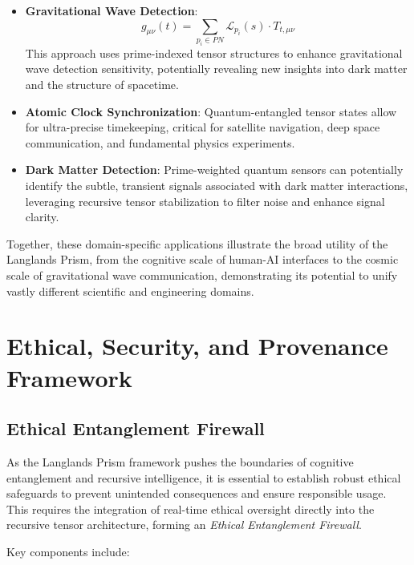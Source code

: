 \documentclass[11pt]{article}
\begin{document}
\begin{itemize}
    \item \textbf{Gravitational Wave Detection}:
    \[
    g_{\mu\nu}(t) = \sum_{p_i \in PN} \mathcal{L}_{p_i}(s) \cdot T_{t, \mu\nu}
    \]
    This approach uses prime-indexed tensor structures to enhance gravitational wave detection sensitivity, potentially revealing new insights into dark matter and the structure of spacetime.

    \item \textbf{Atomic Clock Synchronization}:
    Quantum-entangled tensor states allow for ultra-precise timekeeping, critical for satellite navigation, deep space communication, and fundamental physics experiments.

    \item \textbf{Dark Matter Detection}:
    Prime-weighted quantum sensors can potentially identify the subtle, transient signals associated with dark matter interactions, leveraging recursive tensor stabilization to filter noise and enhance signal clarity.
\end{itemize}

Together, these domain-specific applications illustrate the broad utility of the Langlands Prism, from the cognitive scale of human-AI interfaces to the cosmic scale of gravitational wave communication, demonstrating its potential to unify vastly different scientific and engineering domains.

\section{Ethical, Security, and Provenance Framework}

\subsection{Ethical Entanglement Firewall}

As the Langlands Prism framework pushes the boundaries of cognitive entanglement and recursive intelligence, it is essential to establish robust ethical safeguards to prevent unintended consequences and ensure responsible usage. This requires the integration of real-time ethical oversight directly into the recursive tensor architecture, forming an \textit{Ethical Entanglement Firewall}.

Key components include:
\end{document}
